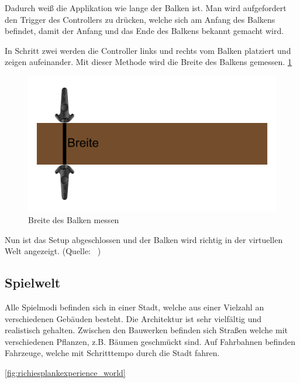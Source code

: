 Dadurch weiß die Applikation wie lange der Balken ist.
Man wird aufgefordert den Trigger des Controllers zu drücken, welche sich am Anfang des Balkens befindet, damit der Anfang und das Ende des Balkens bekannt gemacht wird.



In Schritt zwei werden die Controller links und rechts vom Balken platziert und zeigen aufeinander.
Mit dieser Methode wird die Breite des Balkens gemessen.
\ref{fig:beam_width_measurement} %

\begin {figure}
    \includegraphics[scale=0.18]{pics/beam_width_measurement}
    \caption{Breite des Balken messen}
    \label{fig:beam_width_measurement}
\end {figure}


Nun ist das Setup abgeschlossen und der Balken wird richtig in der virtuellen Welt angezeigt.
(Quelle: ~\cite{ToastGames_2021_Setup})

\subsection{Spielwelt}
\label{sec:richiesplankexperience_world}
Alle Spielmodi befinden sich in einer Stadt, welche aus einer Vielzahl an verschiedenen Gebäuden besteht.
Die Architektur ist sehr vielfältig und realistisch gehalten.
Zwischen den Bauwerken befinden sich Straßen welche mit verschiedenen Pflanzen, z.B. Bäumen geschmückt sind.
Auf Fahrbahnen befinden Fahrzeuge, welche mit Schritttempo durch die Stadt fahren.

\ref{fig:richiesplankexperience_world} %

